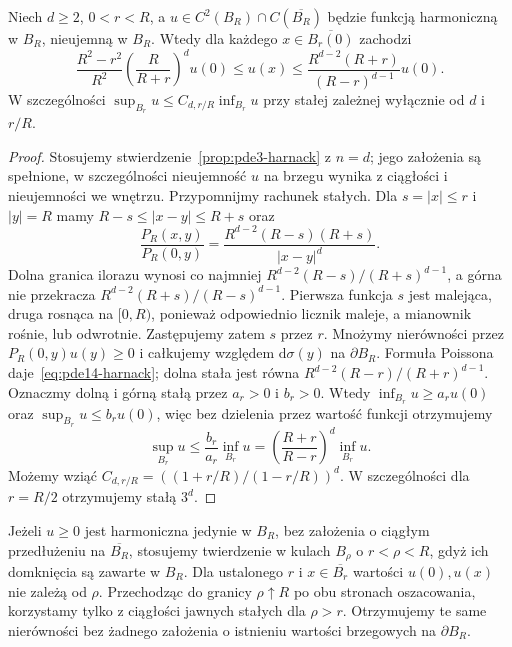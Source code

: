 \begin{twierdzenie}
\label{thm:pde14-harnack}
Niech $d\ge2$, $0<r<R$, a $u\in C^2(B_R)\cap
C(\overline{B_R})$ będzie funkcją harmoniczną w $B_R$,
nieujemną w $B_R$.
Wtedy dla każdego $x\in\overline{B_r(0)}$ zachodzi
\begin{equation}\label{eq:pde14-harnack}
 \frac{R^2-r^2}{R^2}\left(\frac{R}{R+r}\right)^d u(0)
 \le u(x)\le
 \frac{R^{d-2}(R+r)}{(R-r)^{d-1}}u(0).
\end{equation}
W szczególności $\sup_{B_r}u\le C_{d,r/R}\inf_{B_r}u$
przy stałej zależnej wyłącznie od $d$ i $r/R$.
\end{twierdzenie}
\begin{proof}
Stosujemy stwierdzenie~\ref{prop:pde3-harnack} z $n=d$;
jego założenia są spełnione, w szczególności
nieujemność $u$ na brzegu wynika z ciągłości i nieujemności
we wnętrzu. Przypomnijmy rachunek stałych. Dla $s=|x|\le r$ i $|y|=R$ mamy
$R-s\le|x-y|\le R+s$ oraz
\[
 \frac{P_R(x,y)}{P_R(0,y)}
 =\frac{R^{d-2}(R-s)(R+s)}{|x-y|^d}.
\]
Dolna granica ilorazu wynosi co najmniej
$R^{d-2}(R-s)/(R+s)^{d-1}$, a górna nie przekracza
$R^{d-2}(R+s)/(R-s)^{d-1}$. Pierwsza funkcja $s$
jest malejąca, druga rosnąca na $[0,R)$, ponieważ
odpowiednio licznik maleje, a mianownik rośnie, lub
odwrotnie. Zastępujemy zatem $s$ przez $r$.
Mnożymy nierówności przez $P_R(0,y)u(y)\ge0$
i całkujemy względem $\mathrm d\sigma(y)$ na $\partial B_R$.
Formuła Poissona daje~\eqref{eq:pde14-harnack}; dolna
stała jest równa $R^{d-2}(R-r)/(R+r)^{d-1}$.
Oznaczmy dolną i górną stałą przez $a_r>0$ i $b_r>0$.
Wtedy $\inf_{B_r}u\ge a_ru(0)$ oraz
$\sup_{B_r}u\le b_ru(0)$, więc bez dzielenia przez
wartość funkcji otrzymujemy
\[
 \sup_{B_r}u\le\frac{b_r}{a_r}\inf_{B_r}u
 =\left(\frac{R+r}{R-r}\right)^d\inf_{B_r}u.
\]
Możemy wziąć $C_{d,r/R}=((1+r/R)/(1-r/R))^d$.
W szczególności dla $r=R/2$ otrzymujemy stałą $3^d$.
\end{proof}

\begin{uwaga}
Jeżeli $u\ge0$ jest harmoniczna jedynie w $B_R$, bez
założenia o ciągłym przedłużeniu na $\overline{B_R}$,
stosujemy twierdzenie w
kulach $B_\rho$ o $r<\rho<R$, gdyż ich domknięcia
są zawarte w $B_R$. Dla ustalonego $r$ i $x\in\overline{B_r}$
wartości $u(0),u(x)$ nie zależą od $\rho$. Przechodząc
do granicy $\rho\uparrow R$ po obu stronach oszacowania,
korzystamy tylko z ciągłości jawnych stałych dla $\rho>r$.
Otrzymujemy te same nierówności bez żadnego założenia
o istnieniu wartości brzegowych na $\partial B_R$.
\end{uwaga}

